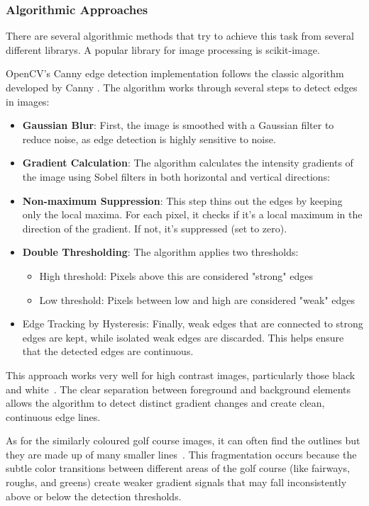 \documentclass[final]{cmpreport_02}
\begin{document}
\subsubsection{Algorithmic Approaches}
There are several algorithmic methods that try to achieve this task from several different librarys. A popular library for image processing is scikit-image.

OpenCV's Canny edge detection implementation \citep{opencv_library} follows the classic algorithm developed by Canny \citep{canny1986computational}.
The algorithm works through several steps to detect edges in images:
\begin{itemize}
	\item \textbf{Gaussian Blur}: First, the image is smoothed with a Gaussian filter to reduce noise, as edge detection is highly sensitive to noise.
	\item \textbf{Gradient Calculation}: The algorithm calculates the intensity gradients of the image using Sobel filters in both horizontal and vertical directions:
	\item \textbf{Non-maximum Suppression}: This step thins out the edges by keeping only the local maxima. For each pixel, it checks if it's a local maximum in the direction of the gradient. If not, it's suppressed (set to zero).
	\item \textbf{Double Thresholding}: The algorithm applies two thresholds:
	      \begin{itemize}
		      \item High threshold: Pixels above this are considered "strong" edges
		      \item Low threshold: Pixels between low and high are considered "weak" edges
	      \end{itemize}
	\item Edge Tracking by Hysteresis: Finally, weak edges that are connected to strong edges are kept, while isolated weak edges are discarded. This helps ensure that the detected edges are continuous.
\end{itemize}
This approach works very well for high contrast images, particularly those black and white~. The clear separation between foreground and background elements allows the algorithm to detect distinct gradient changes and create clean, continuous edge lines.

As for the similarly coloured golf course images, it can often find the outlines but they are made up of many smaller lines~. This fragmentation occurs because the subtle color transitions between different areas of the golf course (like fairways, roughs, and greens) create weaker gradient signals that may fall inconsistently above or below the detection thresholds.
\end{document}
